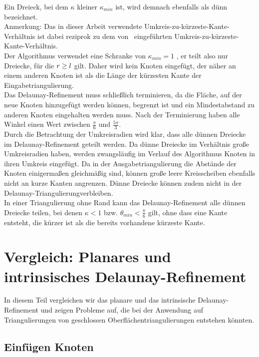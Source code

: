 Ein Dreieck, bei dem $\kappa$ kleiner $\kappa_{min}$ ist, wird demnach ebenfalls als dünn bezeichnet.\\

Anmerkung: Das in dieser Arbeit verwendete Umkreis-zu-kürzeste-Kante-Verhältnis ist dabei  reziprok zu dem  von~\citet{SHEWCHUK:2002:chuws} eingeführten Umkreis-zu-kürzeste-Kante-Verhältnis.\\ 


Der Algorithmus verwendet eine Schranke von $\kappa_{min} = 1 $ 
, er teilt also nur Dreiecke, für die $\umkreisradius* \geq \kuezesteKante*$ gilt. Daher wird kein Knoten eingefügt, der näher an einem anderen Knoten ist als die Länge der kürzesten Kante der Eingabetriangulierung.\\     

Das Delaunay-Refinement muss schließlich terminieren, da die Fläche, auf der neue Knoten hinzugefügt werden können, begrenzt ist und ein Mindestabstand zu anderen Knoten eingehalten werden muss. Nach der Terminierung haben alle Winkel einen Wert zwischen $\frac{\pi}{6}$ und $\frac{5\pi}{3}$.\\

Durch die Betrachtung der Umkreisradien wird klar, dass alle dünnen Dreiecke im  Delaunay-Refinement geteilt werden.
Da dünne Dreiecke im Verhältnis große Umkreisradien haben, werden zwangsläufig im Verlauf des Algorithmus Knoten in ihren Umkreis eingefügt. Da in der Ausgabetriangulierung die Abstände der Knoten einigermaßen gleichmäßig sind, können große leere Kreisscheiben ebenfalls nicht an kurze Kanten angrenzen. Dünne Dreiecke können zudem nicht in der Delaunay-Triangulierungverbleiben.\\    
In einer Triangulierung ohne Rand kann das Delaunay-Refinement alle dünnen Dreiecke teilen, bei denen $\kappa < 1$ bzw. $\theta_{min} < \frac{\pi}{6}$ gilt, ohne dass eine Kante entsteht, die kürzer ist als die bereits vorhandene kürzeste Kante.   

   
\chapter{Vergleich: Planares und intrinsisches Delaunay-Refinement}
In diesem Teil vergleichen wir das planare und das intrinsische Delaunay-Refinement und zeigen Probleme auf, die bei der Anwendung auf Triangulierungen von geschlossen Oberflächentriangulierungen entstehen könnten.   

\section*{Einfügen Knoten}

